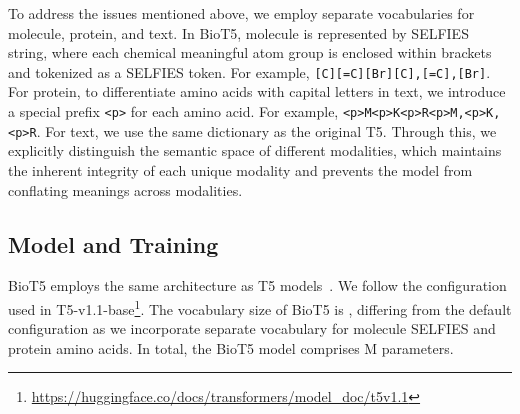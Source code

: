 \documentclass[11pt]{article}
\newcommand{\method}{{BioT5}}
\begin{document}
To address the issues mentioned above, we employ separate vocabularies for molecule, protein, and text.
In \method{}, molecule is represented by SELFIES string, where each chemical meaningful atom group is enclosed within brackets and tokenized as a SELFIES token.
For example, \texttt{[C][=C][Br]}\texttt{[C],[=C],[Br]}.
For protein, to differentiate amino acids with capital letters in text, we introduce a special prefix \texttt{<p>} for each amino acid. For example, \texttt{<p>M<p>K<p>R}\texttt{<p>M,<p>K,<p>R}.
For text, we use the same dictionary as the original T5.
Through this, we explicitly distinguish the semantic space of different modalities, which maintains the inherent integrity of each unique modality and prevents the model from conflating meanings across modalities.

\subsection{Model and Training}
\method{} employs the same architecture as T5 models~\citep{raffel2020exploring}.
We follow the configuration used in T5-v1.1-base\footnote{\url{https://huggingface.co/docs/transformers/model_doc/t5v1.1}}. 
The vocabulary size of \method{} is ,  differing from the default configuration as we incorporate separate vocabulary for molecule SELFIES and protein amino acids.
In total, the \method{} model comprises M parameters.
\end{document}
